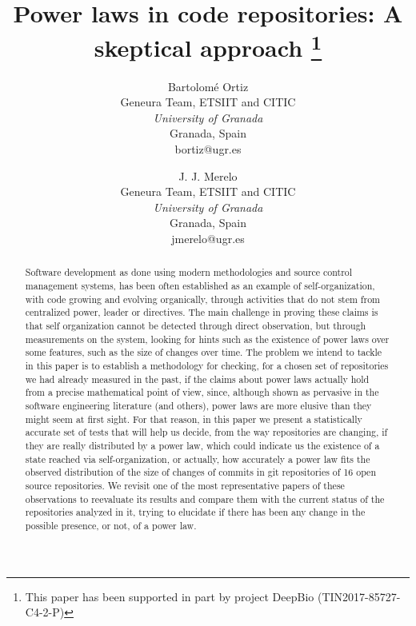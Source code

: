 \documentclass{article}
\begin{document}
\title{Power laws in code repositories: A skeptical approach
  \thanks{This paper has been supported in part by project DeepBio
    (TIN2017-85727-C4-2-P)} }

\author{ Bartolom\'{e} Ortiz\\
  Geneura Team, ETSIIT and CITIC \\
    \textit{University of Granada}\\
    Granada, Spain \\
    bortiz@ugr.es
  \and
  J. J. Merelo\\
  Geneura Team, ETSIIT and CITIC \\
    \textit{University of Granada}\\
    Granada, Spain \\
    jmerelo@ugr.es}

\maketitle

\begin{abstract}
  
  Software development as done using modern methodologies and source
  control management systems, has been often established as an example of
  self-organization, with code growing and evolving organically,
  through activities that do not stem from centralized power, leader
  or directives.  The main challenge in proving these claims is that
  self organization cannot be detected through direct observation, but
  through measurements on the system, looking for hints such as the
  existence of power laws over some features, such as the size of
  changes over time.  The problem we intend to tackle in this paper is to establish a methodology for checking, for a chosen set of repositories we had already measured
  in the past, if the claims about power laws actually hold from a
  precise mathematical point of view, since, although shown as
  pervasive in the software engineering literature (and others), power
  laws are more elusive than they might seem at first sight. For that
  reason, in this paper we present a statistically accurate set of
  tests that will help us decide, from the way repositories are
  changing, if they are really distributed by a power law, which could
  indicate us the existence of a state reached via self-organization,
  or actually, how accurately a power law fits the observed
  distribution of the size of changes of commits in git repositories
  of 16 open source repositories.  We revisit one of the most
  representative papers of these observations to reevaluate its
  results and compare them with the current status of the repositories
  analyzed in it, trying to elucidate if there has been any change in
  the possible presence, or not, of a power law.

\end{abstract}
\end{document}

